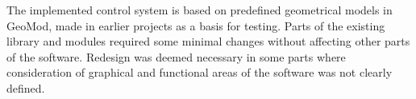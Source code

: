 The implemented control system is based on predefined geometrical models in GeoMod, made in earlier projects as a basis for testing. Parts of the existing library and modules required some minimal changes without affecting other parts of the software. Redesign was deemed necessary in some parts where consideration of graphical and functional areas of the software was not clearly defined.